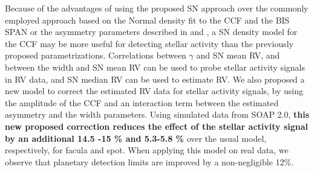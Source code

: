 \documentclass{aa}
\begin{document}
Because of the advantages of using the proposed SN approach over the commonly employed approach based on the Normal density fit to the CCF and the BIS SPAN or the asymmetry parameters described in \citet{Boisse-2011} and \citet{Figueira-2013}, a SN density model for the CCF may be more useful for detecting stellar activity than the previously proposed parametrizations.
Correlations between $\gamma$ and SN mean RV, and between the width and SN mean RV can be used to probe stellar activity signals in RV data, and SN median RV can be used to estimate RV.
We also proposed a new model to correct the estimated RV data for stellar activity signals, by using the amplitude of the CCF and an interaction term between the estimated asymmetry and the width parameters. Using simulated data from SOAP 2.0, {\bf{this new proposed correction reduces the effect of the stellar activity signal by an additional 14.5 -15 \% and 5.3-5.8 \%}} over the usual model, respectively, for facula and spot. When applying this model on real data, we observe that planetary detection limits are improved by a non-negligible 12\%.

\end{document}

